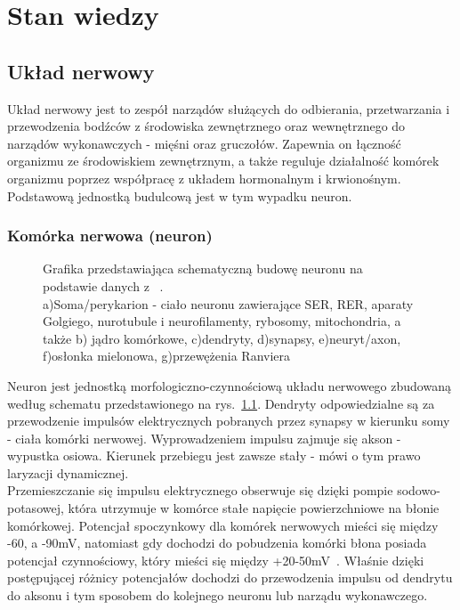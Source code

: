 \documentclass[twoside,a4paper]{book}
\begin{document}
\chapter{Stan wiedzy}
\section{Układ nerwowy}
Układ nerwowy jest to zespół narządów służących do odbierania, przetwarzania i przewodzenia bodźców z środowiska zewnętrznego oraz wewnętrznego do narządów wykonawczych - mięśni oraz gruczołów. Zapewnia on łączność organizmu ze środowiskiem zewnętrznym, a także reguluje działalność komórek organizmu poprzez współpracę z układem hormonalnym i krwionośnym. Podstawową jednostką budulcową jest w tym wypadku neuron.
\subsection{Komórka nerwowa (neuron)}
\begin{figure}[!h]

		\centering		
		\caption{Grafika przedstawiająca schematyczną budowę neuronu na podstawie danych z ~\cite{neurology}.\\ 
		a)Soma/perykarion - ciało neuronu zawierające SER, RER, aparaty Golgiego, nurotubule i neurofilamenty, rybosomy, mitochondria, a także b) jądro komórkowe, c)dendryty, d)synapsy, e)neuryt/axon, f)osłonka mielonowa, g)przewężenia Ranviera  }
		\label{fig:neuron}
	\end{figure}
	Neuron jest jednostką morfologiczno-czynnościową układu nerwowego zbudowaną według schematu przedstawionego na  rys.~\ref{fig:neuron}. Dendryty odpowiedzialne są za przewodzenie impulsów elektrycznych pobranych przez synapsy w kierunku somy - ciała komórki nerwowej. Wyprowadzeniem impulsu zajmuje się akson - wypustka osiowa. Kierunek przebiegu jest zawsze stały  - mówi o tym prawo laryzacji dynamicznej. ~\cite{anatomy}\\ 
Przemieszczanie się impulsu elektrycznego obserwuje się dzięki pompie sodowo-potasowej, która utrzymuje w komórce stałe napięcie powierzchniowe na błonie komórkowej. Potencjał spoczynkowy dla komórek nerwowych mieści się między -60, a -90mV, natomiast gdy dochodzi do pobudzenia komórki błona posiada potencjał czynnościowy, który mieści się między +20-50mV~\cite{neurology}. Właśnie dzięki postępującej różnicy potencjałów dochodzi do przewodzenia impulsu od dendrytu do aksonu i tym sposobem do kolejnego neuronu lub narządu wykonawczego.
\end{document}
